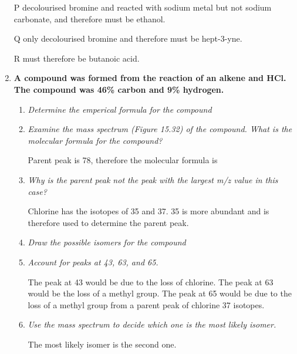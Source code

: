 \documentclass{report}
\begin{document}
\begin{enumerate}
			P decolourised bromine and reacted with sodium metal but not sodium carbonate, and therefore must be ethanol.

			Q only decolourised bromine and therefore must be hept-3-yne.

			R must therefore be butanoic acid.

		\item \textbf{A compound was formed from the reaction of an alkene and HCl. The compound was 46\% carbon and 9\% hydrogen.}

			\begin{enumerate}
				\item \textit{Determine the emperical formula for the compound}


				\item \textit{Examine the mass spectrum (Figure 15.32) of the compound. What is the molecular formula for the compound?}

					Parent peak is 78, therefore the molecular formula is 

				\item \textit{Why is the parent peak not the peak with the largest m/z value in this case?}

					Chlorine has the isotopes of 35 and 37. 35 is more abundant and is therefore used to determine the parent peak.

				\item \textit{Draw the possible isomers for the compound}

					\begin{center}
					\end{center}
					\begin{center}
					\end{center}

				\item \textit{Account for peaks at 43, 63, and 65.}

					The peak at 43 would be due to the loss of chlorine. The peak at 63 would be the loss of a methyl group. The peak at 65 would be due to the loss of a methyl group from a parent peak of chlorine 37 isotopes.

				\item \textit{Use the mass spectrum to decide which one is the most likely isomer.}

					The most likely isomer is the second one.
			\end{enumerate}


\end{enumerate}
\end{document}
